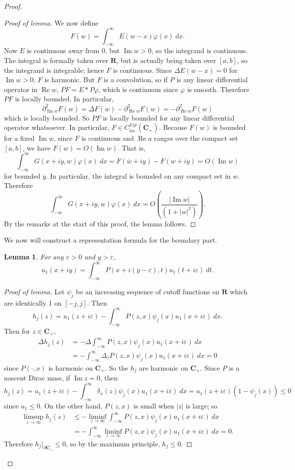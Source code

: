 \documentclass[12pt]{report}
\newcommand{\RR}{\mathbf{R}}
\newcommand{\CC}{\mathbf{C}}
\renewcommand{\Re}{\operatorname{Re}}
\renewcommand{\Im}{\operatorname{Im}}
\newtheorem{lemma}[theorem]{Lemma}
\theoremstyle{definition}
\begin{document}
\begin{proof}
\begin{proof}[Proof of lemma]
    We now define
$$F(w) = \int_{-\infty}^\infty E(w - x)\varphi(x) ~dx.$$
    Now $E$ is continuous away from $0$, but $\Im w > 0$, so the integrand is continuous. The integral is formally taken over $\RR$, but is actually being taken over $[a, b]$, so the integrand is integrable; hence $F$ is continuous. Since $\Delta E(w - x) = 0$ for $\Im w > 0$, $F$ is harmonic. But $F$ is a convolution, so if $P$ is any linear differential operator in $\Re w$, $PF = E * P\varphi$, which is continuous since $\varphi$ is smooth. Therefore $PF$ is locally bounded. In particular,
$$\partial_{\Im w}^2 F(w) = \Delta F(w) - \partial_{\Re w}^2 F(w) = -\partial_{\Re w}^2 F(w)$$
    which is locally bounded. So $PF$ is locally bounded for any linear differential operator whatsoever. In particular, $F \in C^{Lip}_{loc}(\CC_+)$. Because $F(w)$ is bounded for a fixed $\Im w$, since $F$ is continuous and $\Re a$ ranges over the compact set $[a, b]$, we have $F(w) = O(\Im w)$. That is,
$$\int_{-\infty}^\infty G(x + iy, w) \varphi(x) ~dx = F(\overline w + iy) - F(w + iy) = O(\Im w)$$
    for bounded $y$. In particular, the integral is bounded on any compact set in $w$. Therefore
$$\int_{-\infty}^\infty G(x + iy, w) \varphi(x) ~dx = O\left(\frac{|\Im w|}{(1 + |w|^2)}\right).$$
    By the remarks at the start of this proof, the lemma follows.
\end{proof}
    We now will construct a representation formula for the boundary part.
\begin{lemma}
  \label{approximate sigma rep}
    For any $\varepsilon > 0$ and $y > \varepsilon$,
$$u_1(x + iy) = \int_{-\infty}^\infty P(x + i(y-\varepsilon), t) u_1(t + i\varepsilon) ~dt.$$
\end{lemma}
\begin{proof}[Proof of lemma]
    Let $\psi_j$ be an increasing sequence of cutoff functions on $\RR$ which are identically $1$ on $[-j, j]$. Then
$$h_j(z) = u_1(z + i\varepsilon) - \int_{-\infty}^\infty P(z, x)\psi_j(x)u_1(x + i\varepsilon) ~dx.$$
    Then for $z \in \CC_+$,
\begin{align*}
  \Delta h_j(z) &= -\Delta \int_{-\infty}^\infty P(z, x)\psi_j(x) u_1(x + i\varepsilon) ~dx \\
    &= -\int_{-\infty}^\infty \Delta_z P(z, x) \psi_j(x) u_1(x + i\varepsilon) ~dx = 0
\end{align*}
    since $P(\cdot, x)$ is harmonic on $\CC_+$. So the $h_j$ are harmonic on $\CC_+$. Since $P$ is a nascent Dirac mass, if $\Im z = 0$, then
$$h_j(z) = u_1(z + i\varepsilon) - \int_{-\infty}^\infty \delta_x(z) \psi_j(x) u_1(x + i\varepsilon) ~dx = u_1(z + i\varepsilon)(1 - \psi_j(x)) \leq 0$$
    since $u_1 \leq 0$. On the other hand, $P(z, x)$ is small when $|z|$ is large; so
    \begin{align*}\limsup_{z \to \infty} h_j(z) &\leq -\liminf_{z \to \infty} \int_{-\infty}^\infty P(z, x) \psi_j(x) u_1(x + i\varepsilon) ~dx
      \\&= -\int_{-\infty}^\infty \liminf_{z \to \infty} P(z, x) \psi_j(x) u_1(x + i\varepsilon) ~dx = 0.\end{align*}
    Therefore $h_j|_{\partial \CC_+} \leq 0$, so by the maximum principle, $h_j \leq 0$.


\end{proof}
\end{proof}
\end{document}
